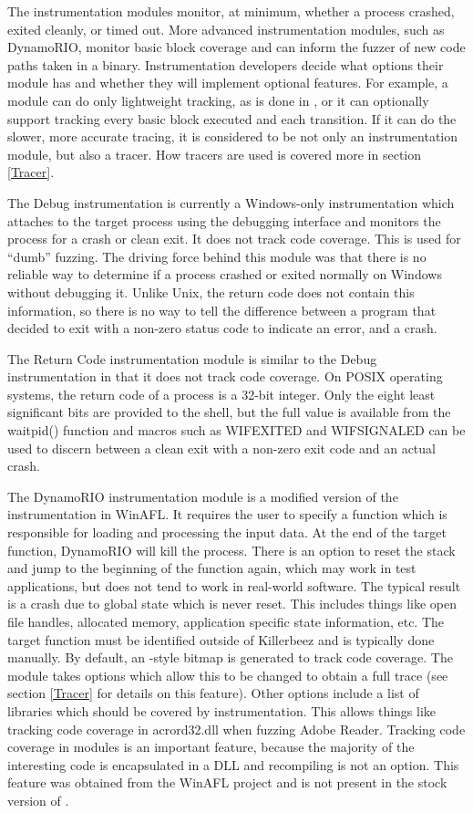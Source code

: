 The instrumentation modules monitor, at minimum, whether a process crashed,
exited cleanly, or timed out. More advanced instrumentation modules, such as
DynamoRIO, monitor basic block coverage and can inform the fuzzer of new code paths
taken in a binary.  Instrumentation developers decide what options their
module has and whether they will implement optional features. For example, a
module can do only lightweight tracking, as is done in \AFL{}, or it can
optionally support tracking every
basic block executed and each transition.  If it can do the slower, more
accurate tracing, it is considered to be not only an instrumentation module,
but also a tracer.  How tracers are used is covered more in section
\ref{Tracer}.

The Debug instrumentation is currently a Windows-only instrumentation which
attaches to the target process using the debugging interface and monitors the
process for a crash or clean exit.  It does not track code coverage.
This is used for ``dumb'' fuzzing.  The driving force behind this module was
that there is no reliable way to determine if a process crashed or exited normally
on Windows without debugging it.  Unlike Unix, the return code does not contain this information,
so there is no way to tell the difference between a program that decided to
exit with a non-zero status code to indicate an error, and a crash.

The Return Code instrumentation module is similar to the Debug instrumentation
in that it does not track code coverage. On POSIX operating systems, the return
code of a process is a 32-bit integer.  Only the eight least significant bits
are provided to the shell, but the full value is available from the
waitpid() function and macros such as WIFEXITED and WIFSIGNALED can be used to
discern between a clean exit with a non-zero exit code and an actual crash.

The DynamoRIO instrumentation module is a modified version of the
instrumentation in WinAFL. It requires the user to specify a function which
is responsible for loading and processing the input data. At the end of the
target function, DynamoRIO will kill the process. There is an option to reset
the stack and jump to the beginning of the function again, which may work in
test applications, but does not tend to work in real-world software.  
The typical result is a crash due to global state which is never reset.
This includes things like open file handles, allocated memory, application specific state
information, etc. The target function must be identified outside of
Killerbeez and is typically done manually. By default, an \AFL{}-style bitmap
is generated to track code coverage. The module takes options which allow this
to be changed to obtain a full trace (see section \ref{Tracer} for details on
this feature). Other options include a list of libraries which should be
covered by instrumentation. This allows things like tracking code coverage in acrord32.dll
when fuzzing Adobe Reader.  Tracking code coverage in modules is an important
feature, because the majority of the interesting code is encapsulated in a
DLL and recompiling is not an option. This feature was obtained from the
WinAFL\cite{winafl} project and is not present in the stock version of \AFL{}.

